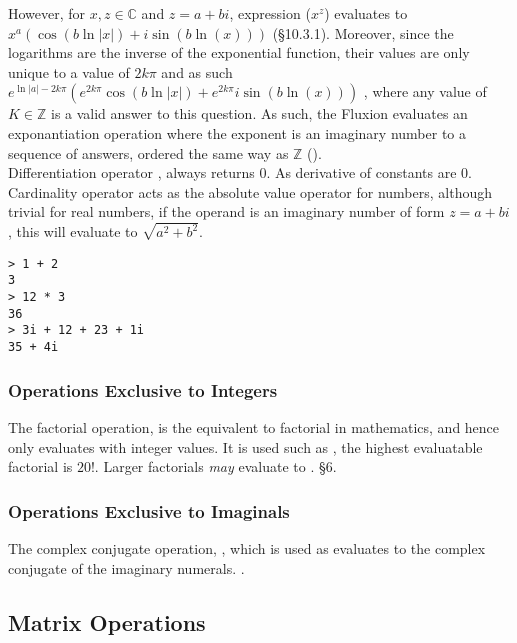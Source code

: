 \documentclass[11pt,a4paper]{book}
\begin{document}
However, for $x, z \in \mathbb{C}$ and $z = a + bi$, expression  ($x^z$) evaluates to $x^a(\cos(b\ln|x|) + i\sin{(b\ln(x))})$ (\S 10.3.1). Moreover, since the logarithms are the inverse of the exponential function, their values are only unique to a value of $2k\pi$ and as such $e^{\ln{|a|} - 2k\pi}(e^{2k\pi}\cos(b\ln|x|) + e^{2k\pi}i\sin{(b\ln(x))})$  \cite{stack}, where any value of $K \in \mathbb{Z}$ is a valid answer to this question. As such, the Fluxion evaluates an exponantiation operation where the exponent is an imaginary number to a sequence of answers, ordered the same way as $\mathbb{Z}$ (). \\

Differentiation operator , always returns 0. As derivative of constants are 0. \\

Cardinality operator \code{||} acts as the absolute value operator for numbers, although trivial for real numbers, if the operand is an imaginary number of form $z = a + bi$, this  will evaluate to $\sqrt{a^2 + b^2}$. \\

\begin{lstlisting}[caption={Example usages of operations}, captionpos=b]
> 1 + 2
3
> 12 * 3
36
> 3i + 12 + 23 + 1i
35 + 4i
\end{lstlisting}

\subsubsection{Operations Exclusive to Integers}

The factorial operation, \code{!} is the equivalent to factorial in mathematics, and hence only evaluates with integer values. It is used such as , the highest evaluatable factorial is $20!$. Larger factorials \textit{may} evaluate to . \S 6.

\subsubsection{Operations Exclusive to Imaginals}

The complex conjugate operation, \code{\textbackslash}, which is used as  evaluates to the complex conjugate of the imaginary numerals. .

\subsection{Matrix Operations}
\end{document}
